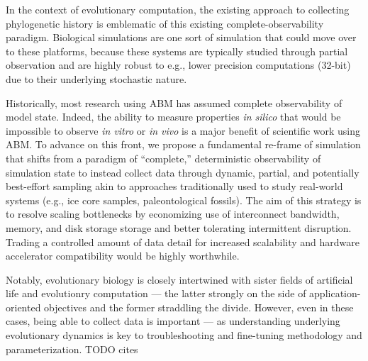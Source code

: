 In the context of evolutionary computation, the existing approach to collecting phylogenetic history is emblematic of this existing complete-observability paradigm.
Biological simulations are one sort of simulation that could move over to these platforms, because these systems are typically studied through partial observation and are highly robust to e.g., lower precision computations (32-bit) due to their underlying stochastic nature.


Historically, most research using ABM has assumed complete observability of model state.
Indeed, the ability to measure properties \textit{in silico} that would be impossible to observe \textit{in vitro} or \textit{in vivo} is a major benefit of scientific work using ABM.
To advance on this front, we propose a fundamental re-frame of simulation that shifts from a paradigm of ``complete,'' deterministic observability of simulation state to instead collect data through dynamic, partial, and potentially best-effort sampling akin to approaches traditionally used to study real-world systems (e.g., ice core samples, paleontological fossils).
The aim of this strategy is to resolve scaling bottlenecks by economizing use of interconnect bandwidth, memory, and disk storage storage and better tolerating intermittent disruption.
Trading a controlled amount of data detail for increased scalability and hardware accelerator compatibility would be highly worthwhile.

Notably, evolutionary biology is closely intertwined with sister fields of artificial life and evolutionry computation --- the latter strongly on the side of application-oriented objectives and the former straddling the divide.
However, even in these cases, being able to collect data is important --- as understanding underlying evolutionary dynamics is key to troubleshooting and fine-tuning methodology and parameterization.
TODO cites

